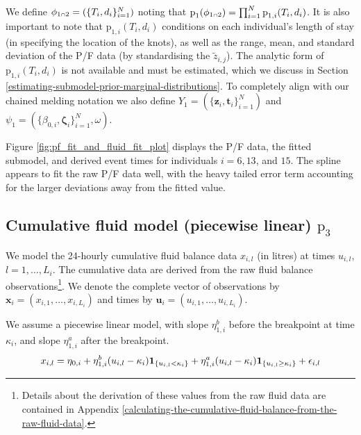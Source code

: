 \documentclass[
  10pt,
  a4paper,
]{article}
\let\Oldcap\cap
\renewcommand{\cap}{\mathrel{\mathsmaller{\Oldcap}}}
\newcommand{\pd}{\text{p}}
\begin{document}
We define \(\phi_{1 \cap 2} = (\{T_{i}, d_{i}\}_{i = 1}^{N})\) noting
that
\(\pd_{1}(\phi_{1 \cap 2}) = \prod_{i = 1}^{N}\pd_{1, i}(T_{i}, d_{i})\).
It is also important to note that \(\pd_{1, i}(T_{i}, d_{i})\)
conditions on each individual's length of stay (in specifying the
location of the knots), as well as the range, mean, and standard
deviation of the P/F data (by standardising the \(\tilde{z}_{i, j}\)).
The analytic form of \(\pd_{1, i}(T_{i}, d_{i})\) is not available and
must be estimated, which we discuss in Section
\ref{estimating-submodel-prior-marginal-distributions}. To completely
align with our chained melding notation we also define
\(Y_{1} = (\{\boldsymbol{z}_{i}, \boldsymbol{t}_{i}\}_{i = 1}^{N})\) and
\(\psi_{1} = (\{\beta_{0, i}, \boldsymbol{\zeta}_{i}\}_{i = 1}^{N}, \omega)\).

Figure \ref{fig:pf_fit_and_fluid_fit_plot} displays the P/F data, the
fitted submodel, and derived event times for individuals \(i = 6, 13\),
and \(15\). The spline appears to fit the raw P/F data well, with the
heavy tailed error term accounting for the larger deviations away from
the fitted value.

\hypertarget{cumulative-fluid-model-piecewise-linear-pd_3}{%
\subsection{\texorpdfstring{Cumulative fluid model (piecewise linear)
\(\pd_{3}\)}{Cumulative fluid model (piecewise linear) \textbackslash pd\_\{3\}}}\label{cumulative-fluid-model-piecewise-linear-pd_3}}

We model the 24-hourly cumulative fluid balance data \(x_{i, l}\) (in
litres) at times \(u_{i, l}\), \(l = 1, \ldots, L_{i}\). The cumulative
data are derived from the raw fluid balance observations\footnote{Details
  about the derivation of these values from the raw fluid data are
  contained in Appendix
  \ref{calculating-the-cumulative-fluid-balance-from-the-raw-fluid-data}.}.
We denote the complete vector of observations by
\(\boldsymbol{x}_{i} = (x_{i, 1}, \ldots, x_{i, L_{i}})\) and times by
\(\boldsymbol{u}_{i} = (u_{i, 1}, \ldots, u_{i, L_{i}})\).

We assume a piecewise linear model, with slope \(\eta_{1, i}^{b}\)
before the breakpoint at time \(\kappa_{i}\), and slope
\(\eta_{1, i}^{a}\) after the breakpoint. \begin{equation}
  x_{i, l} = \eta_{0, i} + \eta^{b}_{1, i}(u_{i, l} - \kappa_{i})\boldsymbol{1}_{\{u_{i, l} < \kappa_{i}\}} + \eta^{a}_{1, i}(u_{i, l} - \kappa_{i})\boldsymbol{1}_{\{u_{i, l} \geq \kappa_{i}\}} + \epsilon_{i, l} \\
   \label{eqn:piecewise-fluid-model}
\end{equation}
\end{document}
